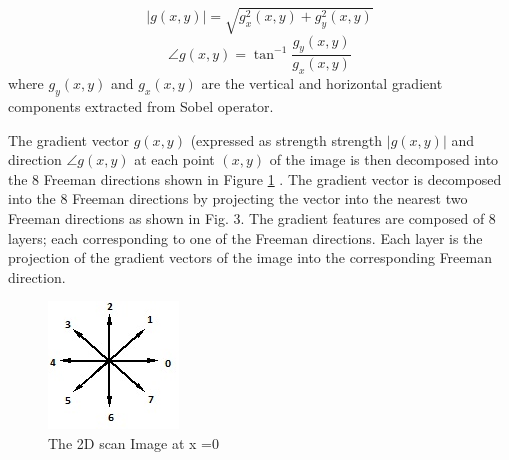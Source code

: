 \documentclass[conference]{IEEEtran}
\begin{document}
\begin{equation}
|g(x,y)|=\sqrt{g^{2}_{x}(x,y)+g^{2}_{y}(x,y)}
\label{eq:1}
\end{equation}
\begin{equation}
\angle g(x,y)=\tan^{-1} \frac{g_{y}(x,y)}{g_{x}(x,y)}
\label{eq:2}
\end{equation}
where $g_{y}(x,y)$ and $g_{x}(x,y)$ are the vertical and horizontal gradient components extracted from Sobel operator.

The gradient vector $g(x,y)$ (expressed as strength strength $|g(x,y)|$ and direction $\angle g(x,y)$  at each point $(x,y)$ of the image is then decomposed into the 8 Freeman\cite{gonzales2002} directions shown in Figure \ref{fig:freeman} . The gradient vector is decomposed into the 8 Freeman directions by projecting the vector into the nearest two Freeman directions as shown in Fig. 3.
The gradient features are composed of 8 layers; each corresponding to one of the Freeman directions. Each layer is the projection of the gradient vectors of the image into the corresponding Freeman direction.

 \begin{figure}
\centering
\label{fig:freeman}
\includegraphics[scale=0.55]{images/freemanCodes.jpg}
 \caption{The 2D scan Image at x =0 }
\end{figure}


%
%
\end{document}
